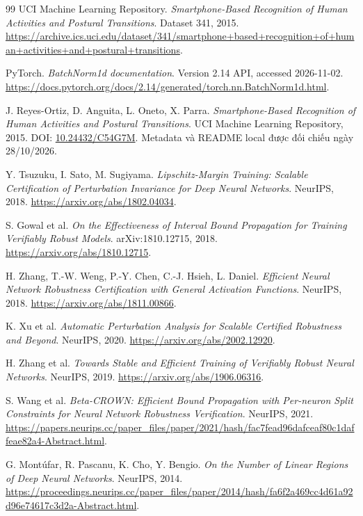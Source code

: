 \documentclass[11pt,a4paper]{article}
\theoremstyle{remark}
\begin{document}
\begin{thebibliography}{99}
 UCI Machine Learning Repository.
\emph{Smartphone-Based Recognition of Human Activities and Postural
Transitions}. Dataset 341, 2015.
\url{https://archive.ics.uci.edu/dataset/341/smartphone+based+recognition+of+human+activities+and+postural+transitions}.

 PyTorch.
\emph{BatchNorm1d documentation}. Version 2.14 API, accessed 2026-11-02.
\url{https://docs.pytorch.org/docs/2.14/generated/torch.nn.BatchNorm1d.html}.

 J. Reyes-Ortiz, D. Anguita, L. Oneto, X. Parra.
\emph{Smartphone-Based Recognition of Human Activities and Postural
Transitions}. UCI Machine Learning Repository, 2015.
DOI: \href{https://doi.org/10.24432/C54G7M}{10.24432/C54G7M}.
Metadata và README local được đối chiếu ngày 28/10/2026.

 Y. Tsuzuku, I. Sato, M. Sugiyama.
\emph{Lipschitz-Margin Training: Scalable Certification of Perturbation
Invariance for Deep Neural Networks}. NeurIPS, 2018.
\url{https://arxiv.org/abs/1802.04034}.

 S. Gowal et al.
\emph{On the Effectiveness of Interval Bound Propagation for Training
Verifiably Robust Models}. arXiv:1810.12715, 2018.
\url{https://arxiv.org/abs/1810.12715}.

 H. Zhang, T.-W. Weng, P.-Y. Chen, C.-J. Hsieh, L. Daniel.
\emph{Efficient Neural Network Robustness Certification with General
Activation Functions}. NeurIPS, 2018.
\url{https://arxiv.org/abs/1811.00866}.

 K. Xu et al.
\emph{Automatic Perturbation Analysis for Scalable Certified Robustness
and Beyond}. NeurIPS, 2020.
\url{https://arxiv.org/abs/2002.12920}.

 H. Zhang et al.
\emph{Towards Stable and Efficient Training of Verifiably Robust Neural
Networks}. NeurIPS, 2019.
\url{https://arxiv.org/abs/1906.06316}.

 S. Wang et al.
\emph{Beta-CROWN: Efficient Bound Propagation with Per-neuron Split
Constraints for Neural Network Robustness Verification}. NeurIPS, 2021.
\url{https://papers.neurips.cc/paper_files/paper/2021/hash/fac7fead96dafceaf80c1daffeae82a4-Abstract.html}.

 G. Mont\'ufar, R. Pascanu, K. Cho, Y. Bengio.
\emph{On the Number of Linear Regions of Deep Neural Networks}.
NeurIPS, 2014.
\url{https://proceedings.neurips.cc/paper_files/paper/2014/hash/fa6f2a469cc4d61a92d96e74617c3d2a-Abstract.html}.


\end{thebibliography}
\end{document}
